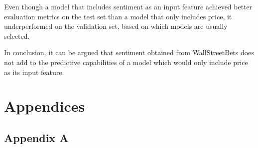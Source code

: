 \documentclass[11pt, a4paper]{article}
\begin{document}
Even though a model that includes sentiment as an input feature achieved better evaluation metrics on the test set than a model that only includes price,
it underperformed on the validation set, based on which models are usually selected.

In conclusion, it can be argued that sentiment obtained from WallStreetBets
does not add to the predictive capabilities of a model which would only include price as its input feature.

\newpage

\pagebreak
\section{Appendices}

\subsection{Appendix A}
\label{appendix:A}
\end{document}
